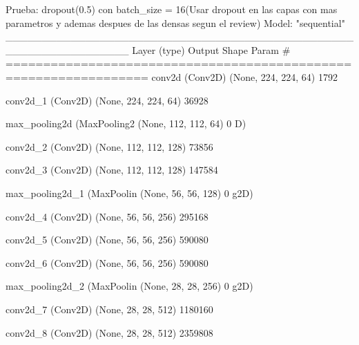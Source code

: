\documentclass[11pt, a4paper]{article} %
\begin{document}
Prueba: dropout(0.5) con batch_size = 16(Usar dropout en las capas con mas parametros y ademas despues de las densas segun el review)
Model: "sequential"
_________________________________________________________________
 Layer (type)                Output Shape              Param #   
=================================================================
 conv2d (Conv2D)             (None, 224, 224, 64)      1792      
                                                                 
 conv2d_1 (Conv2D)           (None, 224, 224, 64)      36928     
                                                                 
 max_pooling2d (MaxPooling2  (None, 112, 112, 64)      0         
 D)                                                              
                                                                 
 conv2d_2 (Conv2D)           (None, 112, 112, 128)     73856     
                                                                 
 conv2d_3 (Conv2D)           (None, 112, 112, 128)     147584    
                                                                 
 max_pooling2d_1 (MaxPoolin  (None, 56, 56, 128)       0         
 g2D)                                                            
                                                                 
 conv2d_4 (Conv2D)           (None, 56, 56, 256)       295168    
                                                                 
 conv2d_5 (Conv2D)           (None, 56, 56, 256)       590080    
                                                                 
 conv2d_6 (Conv2D)           (None, 56, 56, 256)       590080    
                                                                 
 max_pooling2d_2 (MaxPoolin  (None, 28, 28, 256)       0         
 g2D)                                                            
                                                                 
 conv2d_7 (Conv2D)           (None, 28, 28, 512)       1180160   
                                                                 
 conv2d_8 (Conv2D)           (None, 28, 28, 512)       2359808   
                                                                 
\end{document}
